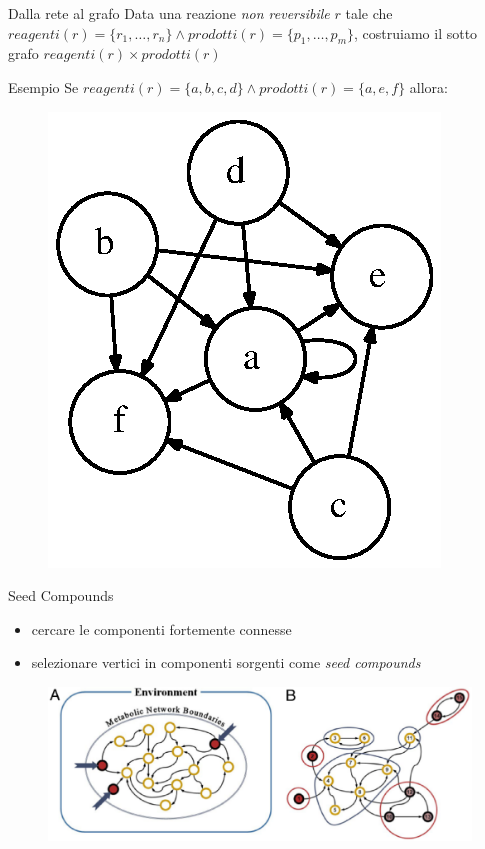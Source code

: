 \documentclass{beamer}
\begin{document}
\begin{frame}{Dalla rete al grafo}
  Data una reazione \emph{non reversibile} $r$ tale che $reagenti(r) =
  \{ r_{1}, \ldots, r_{n} \} \wedge prodotti(r) = \{ p_{1}, \ldots,
  p_{m} \}$, costruiamo il sotto grafo $reagenti(r) \times
  prodotti(r)$
    \begin{block}{Esempio}
      Se $reagenti(r) = \{ a, b, c, d \} \wedge prodotti(r) = \{a, e,
      f\}$ allora:
      \begin{figure}
        \centering
        \includegraphics[scale=.6]{images/non-reversible-reaction-example.dot.eps}
        \label{fig:non-reversible-reaction-mapping}
      \end{figure}
    \end{block}
\end{frame}

\begin{frame}{Seed Compounds}
  \begin{itemize}
  \item cercare le componenti fortemente connesse
  \item selezionare vertici in componenti sorgenti come \emph{seed
      compounds}
  \end{itemize}
  \begin{figure}
    \includegraphics[scale=.35]{images/biology-scc-decomposition.eps}
  \end{figure}

\end{frame}
\end{document}
